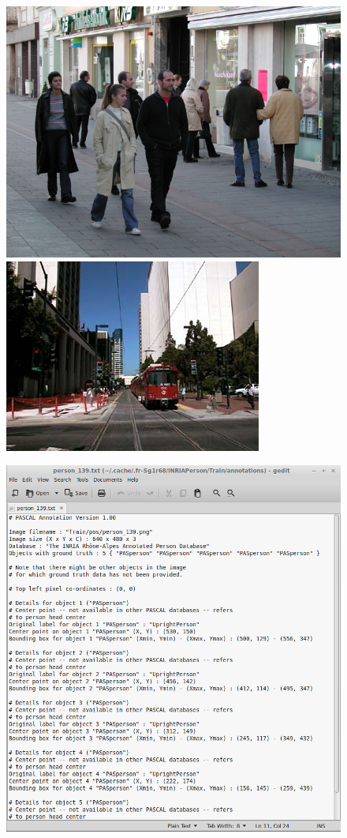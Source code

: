 \documentclass{beamer}
\begin{document}
\begin{frame}
\begin{figure}
\includegraphics{img/person_139.png}
\includegraphics[scale=0.3]{img/neg.png}
\end{figure}
\begin{figure}
\includegraphics[scale=0.3]{img/annot_139.png}
\end{figure}
\end{frame}
\end{document}
